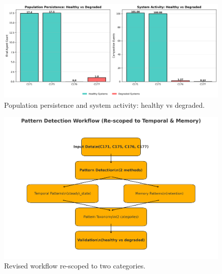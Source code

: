 \documentclass[11pt]{article}
\begin{document}
\begin{figure}[t]
\centering
\includegraphics[width=0.9\linewidth]{figure7_population_collapse_comparison.png}
\caption{Population persistence and system activity: healthy vs degraded.}
\end{figure}

\begin{figure}[t]
\centering
\includegraphics[width=0.9\linewidth]{figure8_pattern_detection_workflow_v2.png}
\caption{Revised workflow re-scoped to two categories.}
\end{figure}
\end{document}
